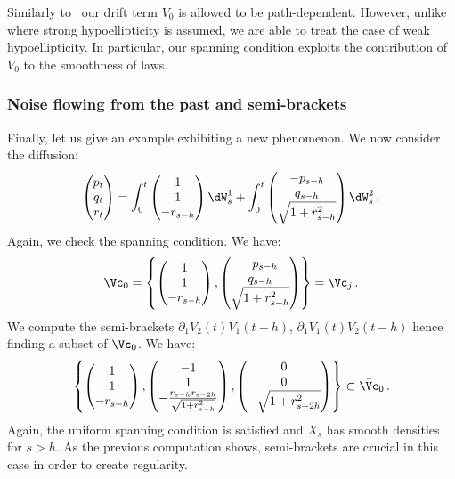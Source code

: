 Similarly to~\cite{takeuchi2007a} our drift term $V_0$ is allowed to be path-dependent. However, unlike~\cite{takeuchi2007a} where strong hypoellipticity is assumed, we are able to treat the case of weak hypoellipticity. In particular, our spanning condition exploits the contribution of $V_0$ to the smoothness of laws.

\subsubsection{Noise flowing from the past and semi-brackets}
Finally, let us give an example exhibiting a new phenomenon. We now consider the diffusion:
\[
\begin{pmatrix}
p_t \\
q_t\\
r_t
\end{pmatrix}=
\int_0^t
\begin{pmatrix}
1 \\
1\\
-r_{s-h}
\end{pmatrix}\dW^1_s +\int_0^t 
\begin{pmatrix}
-p_{s-h} \\
q_{s-h}\\
\sqrt{1+ r^2_{s-h}}
\end{pmatrix} \dW^2_s \, .
\]
Again, we check the spanning condition. We have:
\[
\Vc_0= \left\{
\begin{pmatrix}
1 \\
1 \\
-r_{s-h}
\end{pmatrix},
\begin{pmatrix}
-p_{s-h} \\
q_{s-h}\\
\sqrt{1+ r^2_{s-h}}
\end{pmatrix}\right\}=\Vc_j \, .
\]
We compute the semi-brackets $\partial_1 V_2(t) V_1(t-h)$, $\partial_1 V_1(t) V_2(t-h)$ hence finding a subset of $\bar \Vc_0$. We have:
\[
\left\{
\begin{pmatrix} 1 \\ 1\\ -r_{s-h}
\end{pmatrix},
\begin{pmatrix} -1 \\ 1\\ -\frac{r_{s-h}r_{s-2h}}{\sqrt{1+r_{s-h}^2}}
\end{pmatrix},
\begin{pmatrix} 0 \\ 0\\ -\sqrt{1+r_{s-2h}^2}
\end{pmatrix}\right\} \subset \bar \Vc_0 \, .
\]
Again, the uniform spanning condition is satisfied and $X_s$ has smooth densities for $s>h$. As the previous computation shows, semi-brackets are crucial in this case in order to create regularity.

